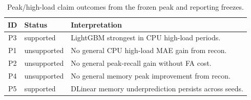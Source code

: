 \begin{table}[width=\columnwidth,pos=t]
\centering
\caption{Peak/high-load claim outcomes from the frozen peak and reporting freezes.}
\label{tab:peaks}
\begin{threeparttable}
\small
\begin{tabularx}{\tblwidth}{@{}cl>{\raggedright\arraybackslash}X@{}}
\toprule
ID & Status & Interpretation \\
\midrule
P3 & supported & LightGBM strongest in CPU high-load periods. \\
P1 & unsupported & No general CPU high-load MAE gain from recon. \\
P2 & unsupported & No general peak-recall gain without FA cost. \\
P4 & unsupported & No general memory peak improvement from recon. \\
P5 & supported & DLinear memory underprediction persists across seeds. \\
\bottomrule
\end{tabularx}
\end{threeparttable}
\end{table}
